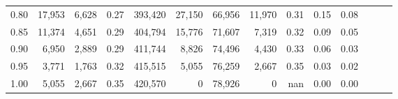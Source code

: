 \begin{tabular}{rrrrrrrrrrrrrr}
0.80 &  17,953 &  6,628 &  0.27 &  393,420 &   27,150 &  66,956 &  11,970 &  0.31 &  0.15 &      0.08 \\
0.85 &  11,374 &  4,651 &  0.29 &  404,794 &   15,776 &  71,607 &   7,319 &  0.32 &  0.09 &      0.05 \\
0.90 &   6,950 &  2,889 &  0.29 &  411,744 &    8,826 &  74,496 &   4,430 &  0.33 &  0.06 &      0.03 \\
0.95 &   3,771 &  1,763 &  0.32 &  415,515 &    5,055 &  76,259 &   2,667 &  0.35 &  0.03 &      0.02 \\
1.00 &   5,055 &  2,667 &  0.35 &  420,570 &        0 &  78,926 &       0 &   nan &  0.00 &      0.00 \\
\bottomrule
\end{tabular}
